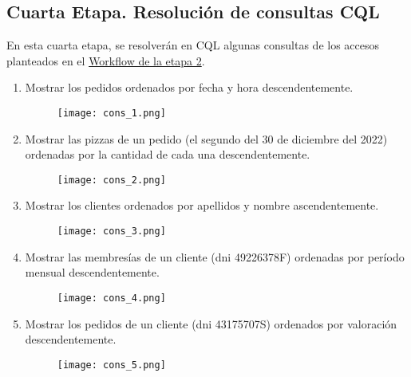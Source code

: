 \documentclass[a4paper]{article}
\begin{document}
\newpage

\subsection{\huge{Cuarta Etapa. Resolución de consultas CQL}}

En esta cuarta etapa, se resolverán en CQL algunas consultas de los accesos planteados en el \hyperref[Workflow]{Workflow de la etapa 2}.

\begin{enumerate}
    \item Mostrar los pedidos ordenados por fecha y hora descendentemente.

    \begin{figure}[H]
        \centering
        \texttt{[image: cons\_1.png]}
        \label{fig:cons_1}
    \end{figure}

    \item Mostrar las pizzas de un pedido (el segundo del 30 de diciembre del 2022) ordenadas por la cantidad de cada una descendentemente.

    \begin{figure}[H]
        \centering
        \texttt{[image: cons\_2.png]}
        \label{fig:cons_2}
    \end{figure}

    \item Mostrar los clientes ordenados por apellidos y nombre ascendentemente.

    \begin{figure}[H]
        \centering
        \texttt{[image: cons\_3.png]}
        \label{fig:cons_3}
    \end{figure}

    \newpage
    
    \item Mostrar las membresías de un cliente (dni 49226378F) ordenadas por período mensual descendentemente.

    \begin{figure}[H]
        \centering
        \texttt{[image: cons\_4.png]}
        \label{fig:cons_4}
    \end{figure}

    \item Mostrar los pedidos de un cliente (dni 43175707S) ordenados por valoración descendentemente.

    \begin{figure}[H]
        \centering
        \texttt{[image: cons\_5.png]}
        \label{fig:cons_5}
    \end{figure}


\end{enumerate}
\end{document}
